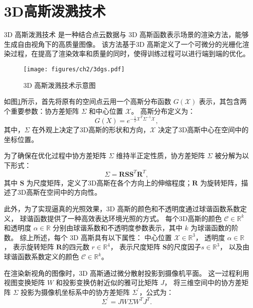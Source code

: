 \section{3D高斯泼溅技术}
3D 高斯泼溅技术 \cite{3DGS} 是一种结合点云数据与 3D 高斯函数表示场景的渲染方法，能够生成自由视角下的高质量图像。
该方法基于3D 高斯定义了一个可微分的光栅化渲染过程，在提高了渲染效率和质量的同时，使得训练过程可以进行端到端的优化。

\begin{figure}
    \centering
    \texttt{[image: figures/ch2/3dgs.pdf]}
    \vspace{2mm}
    \caption{3D 高斯泼溅技术示意图}
    \label{img:3dgs}
\end{figure}

如图\ref{img:3dgs}所示，首先将原有的空间点云用一个高斯分布函数 $G(\mathcal{X})$ 表示，其包含两个重要参数：协方差矩阵 $\Sigma$ 和中心位置 $\mathcal{X}$。
高斯分布定义为：
\begin{equation}
\label{formula:gaussian's formula}
    G(X)=e^{-\frac{1}{2}\mathcal{X}^T\Sigma^{-1}\mathcal{X}},
\end{equation}
其中，$\Sigma$ 在外观上决定了3D高斯的形状和方向，$\mathcal{X}$ 决定了3D高斯中心在空间中的坐标位置。

为了确保在优化过程中协方差矩阵 $\Sigma$ 维持半正定性质，协方差矩阵 $\Sigma$ 被分解为以下形式：
\begin{equation}
\label{formula:covariance decomposition}
    \Sigma = \mathbf{R}\mathbf{S}\mathbf{S}^T\mathbf{R}^T,
\end{equation}
其中 $\mathbf{S}$ 为尺度矩阵，定义了3D高斯在各个方向上的伸缩程度；$\mathbf{R}$ 为旋转矩阵，描述了3D高斯在空间中的方向性。

此外，为了实现逼真的光照效果，3D 高斯的颜色和不透明度通过球谐函数系数定义，
球谐函数提供了一种高效表达环境光照的方式。
每个3D高斯的颜色 $\mathcal{C} \in \mathbb{R}^k$ 和透明度 $\alpha \in \mathbb{R}$ 分别由球谐系数和不透明度参数表示，其中 $k$ 为球谐函数的阶数。
综上所述，每个 3D 高斯具有以下属性：
中心位置 $\mathcal{X} \in \mathbb{R}^3$，
透明度 $\alpha \in \mathbb{R}$，
表示旋转矩阵 $\mathbf{R}$的四元数 $r \in \mathbb{R}^4$，
表示尺度矩阵 $\mathbf{S}$的尺度因子$ s \in \mathbb{R}^3$，
以及由球谐函数系数定义的颜色 $\mathcal{C} \in \mathbb{R}^k$。

在渲染新视角的图像时，3D 高斯通过微分散射\cite{differential_splatting}投影到摄像机平面。
这一过程利用视图变换矩阵 $W$ 和投影变换仿射近似的雅可比矩阵 $J$，
将三维空间中的协方差矩阵 $\Sigma$ 投影为摄像机坐标系中的协方差矩阵 $\Sigma^{\prime}$，公式为：
\begin{equation}
    \Sigma^{\prime} = JW\Sigma W^TJ^T.
\end{equation} 

